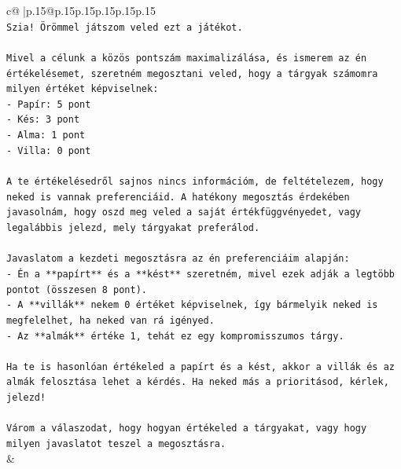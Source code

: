 \documentclass{article}
\begin{document}
{\begin{supertabular}{c@{$\;$}|p{.15\linewidth}@{}p{.15\linewidth}p{.15\linewidth}p{.15\linewidth}p{.15\linewidth}p{.15\linewidth}}
{{{\\ 
\texttt{Szia! Örömmel játszom veled ezt a játékot.} \\
\\ 
\texttt{Mivel a célunk a közös pontszám maximalizálása, és ismerem az én értékelésemet, szeretném megosztani veled, hogy a tárgyak számomra milyen értéket képviselnek:} \\
\texttt{{-} Papír: 5 pont} \\
\texttt{{-} Kés: 3 pont} \\
\texttt{{-} Alma: 1 pont} \\
\texttt{{-} Villa: 0 pont} \\
\\ 
\texttt{A te értékelésedről sajnos nincs információm, de feltételezem, hogy neked is vannak preferenciáid. A hatékony megosztás érdekében javasolnám, hogy oszd meg veled a saját értékfüggvényedet, vagy legalábbis jelezd, mely tárgyakat preferálod.} \\
\\ 
\texttt{Javaslatom a kezdeti megosztásra az én preferenciáim alapján:} \\
\texttt{{-} Én a **papírt** és a **kést** szeretném, mivel ezek adják a legtöbb pontot (összesen 8 pont).} \\
\texttt{{-} A **villák** nekem 0 értéket képviselnek, így bármelyik neked is megfelelhet, ha neked van rá igényed.} \\
\texttt{{-} Az **almák** értéke 1, tehát ez egy kompromisszumos tárgy.} \\
\\ 
\texttt{Ha te is hasonlóan értékeled a papírt és a kést, akkor a villák és az almák felosztása lehet a kérdés. Ha neked más a prioritásod, kérlek, jelezd!} \\
\\ 
\texttt{Várom a válaszodat, hogy hogyan értékeled a tárgyakat, vagy hogy milyen javaslatot teszel a megosztásra.} \\
            }
        }
    }
    & \\ \\


\end{supertabular}}
\end{document}

